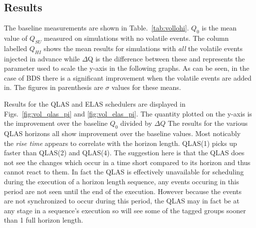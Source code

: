 \subsection{Results}

The baseline measurements are shown in Table.~\ref{tab:vollohi}. $Q_0$ is the mean value of $Q_{SU}$ measured on simulations with no volatile events. The column labelled $Q_{HI}$ shows the mean results for simulations with \emph{all} the volatile events injected in advance while $\Delta$Q is the difference between these and represents the parameter used to scale the y-axis in the following graphs. As can be seen, in the case of BDS there is a significant improvement when the volatile events are added in. The figures in parenthesis are $\sigma$ values for these means.

Results for the QLAS and ELAS schedulers are displayed in Figs.~\ref{fig:vol_qlas_pi} and \ref{fig:vol_elas_pi}. The quantity plotted on the y-axis is the improvement over the baseline $Q_0$ divided by $\Delta Q$ The results for the various QLAS horizons all show improvement over the baseline values. Most noticably the \emph{rise time} appears to correlate with the horizon length.  QLAS(1) picks up faster than QLAS(2) and QLAS(4). The suggestion here is that the QLAS does not see the changes which occur in a time short compared to its horizon and thus cannot react to them. In fact the QLAS is effectively unavailable for scheduling during the execution of a horizon length sequence, any events occuring in this period are not seen until the end of the execution. However because the events are not synchronized to occur during this period, the QLAS may in fact be at any stage in a sequence's execution so will see some of the tagged groups sooner than 1 full horizon length.

